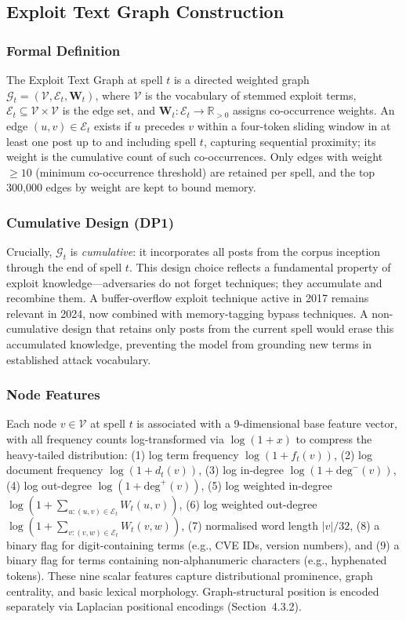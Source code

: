 \documentclass[12pt]{article}
\begin{document}
\subsection{Exploit Text Graph Construction}

\subsubsection{Formal Definition}

The Exploit Text Graph at spell $t$ is a directed weighted graph $\mathcal{G}_t = (\mathcal{V}, \mathcal{E}_t, \mathbf{W}_t)$, where $\mathcal{V}$ is the vocabulary of stemmed exploit terms, $\mathcal{E}_t \subseteq \mathcal{V} \times \mathcal{V}$ is the edge set, and $\mathbf{W}_t : \mathcal{E}_t \rightarrow \mathbb{R}_{>0}$ assigns co-occurrence weights. An edge $(u, v) \in \mathcal{E}_t$ exists if $u$ precedes $v$ within a four-token sliding window in at least one post up to and including spell $t$, capturing sequential proximity; its weight is the cumulative count of such co-occurrences. Only edges with weight $\geq 10$ (minimum co-occurrence threshold) are retained per spell, and the top 300,000 edges by weight are kept to bound memory.

\subsubsection{Cumulative Design (DP1)}

Crucially, $\mathcal{G}_t$ is \textit{cumulative}: it incorporates all posts from the corpus inception through the end of spell $t$. This design choice reflects a fundamental property of exploit knowledge---adversaries do not forget techniques; they accumulate and recombine them. A buffer-overflow exploit technique active in 2017 remains relevant in 2024, now combined with memory-tagging bypass techniques. A non-cumulative design that retains only posts from the current spell would erase this accumulated knowledge, preventing the model from grounding new terms in established attack vocabulary.

\subsubsection{Node Features}

Each node $v \in \mathcal{V}$ at spell $t$ is associated with a 9-dimensional base feature vector, with all frequency counts log-transformed via $\log(1+x)$ to compress the heavy-tailed distribution: (1) log term frequency $\log(1+f_t(v))$, (2) log document frequency $\log(1+d_t(v))$, (3) log in-degree $\log(1+\text{deg}^-(v))$, (4) log out-degree $\log(1+\text{deg}^+(v))$, (5) log weighted in-degree $\log(1+\sum_{u:(u,v)\in\mathcal{E}_t} W_t(u,v))$, (6) log weighted out-degree $\log(1+\sum_{v:(v,w)\in\mathcal{E}_t} W_t(v,w))$, (7) normalised word length $|v|/32$, (8) a binary flag for digit-containing terms (e.g., CVE IDs, version numbers), and (9) a binary flag for terms containing non-alphanumeric characters (e.g., hyphenated tokens). These nine scalar features capture distributional prominence, graph centrality, and basic lexical morphology. Graph-structural position is encoded separately via Laplacian positional encodings (Section~4.3.2).
\end{document}
